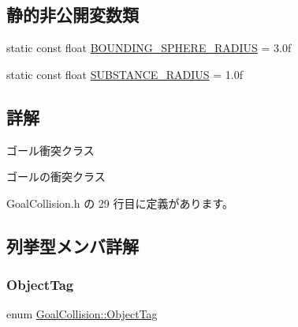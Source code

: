 \subsection*{静的非公開変数類}
\begin{DoxyCompactItemize}
\item 
static const float \mbox{\hyperlink{class_goal_collision_ad2a608feb369a4d10d8ab06ebc656959}{B\+O\+U\+N\+D\+I\+N\+G\+\_\+\+S\+P\+H\+E\+R\+E\+\_\+\+R\+A\+D\+I\+US}} = 3.\+0f
\item 
static const float \mbox{\hyperlink{class_goal_collision_a6eb0dff2f8f77b38067eee8b22cce08a}{S\+U\+B\+S\+T\+A\+N\+C\+E\+\_\+\+R\+A\+D\+I\+US}} = 1.\+0f
\end{DoxyCompactItemize}


\subsection{詳解}
ゴール衝突クラス 

ゴールの衝突クラス 

 Goal\+Collision.\+h の 29 行目に定義があります。



\subsection{列挙型メンバ詳解}
\mbox{\label{class_goal_collision_a8d0d760973816d9086df90491f38ff62}} 
\subsubsection{\texorpdfstring{Object\+Tag}{ObjectTag}}
{\footnotesize\ttfamily enum \mbox{\hyperlink{class_goal_collision_a8d0d760973816d9086df90491f38ff62}{Goal\+Collision\+::\+Object\+Tag}}}

